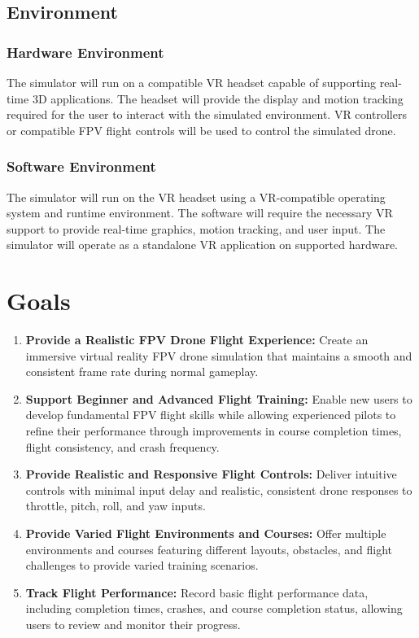 \documentclass{article}
\begin{document}
\subsection{Environment}


\subsubsection{Hardware Environment}

The simulator will run on a compatible VR headset capable of supporting real-time 3D applications. The headset will provide the display and motion tracking required for the user to interact with the simulated environment. VR controllers or compatible FPV flight controls will be used to control the simulated drone.

\subsubsection{Software Environment}

The simulator will run on the VR headset using a VR-compatible operating system and runtime environment. The software will require the necessary VR support to provide real-time graphics, motion tracking, and user input. The simulator will operate as a standalone VR application on supported hardware.


\section{Goals}

\begin{enumerate}
    \item \textbf{Provide a Realistic FPV Drone Flight Experience:} Create an immersive virtual reality FPV drone simulation that maintains a smooth and consistent frame rate during normal gameplay.

    \item \textbf{Support Beginner and Advanced Flight Training:} Enable new users to develop fundamental FPV flight skills while allowing experienced pilots to refine their performance through improvements in course completion times, flight consistency, and crash frequency.

    \item \textbf{Provide Realistic and Responsive Flight Controls:} Deliver intuitive controls with minimal input delay and realistic, consistent drone responses to throttle, pitch, roll, and yaw inputs.

    \item \textbf{Provide Varied Flight Environments and Courses:} Offer multiple environments and courses featuring different layouts, obstacles, and flight challenges to provide varied training scenarios.

    \item \textbf{Track Flight Performance:} Record basic flight performance data, including completion times, crashes, and course completion status, allowing users to review and monitor their progress.
\end{enumerate}
\end{document}

